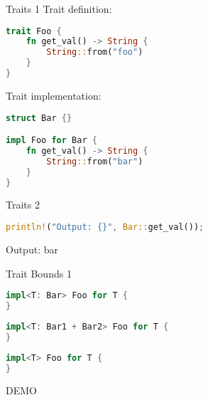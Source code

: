 
\begin{frame}[fragile,t]{Traits 1}
    Trait definition:
    \begin{lstlisting}[language=Rust,escapechar=@,label={lst:traits1}]
trait Foo {
    fn get_val() -> String {
        String::from("foo")
    }
}\end{lstlisting}

    \pause
    Trait implementation:
    \begin{lstlisting}[language=Rust,escapechar=@,label={lst:traits2}]
struct Bar {}

impl Foo for Bar {
    fn get_val() -> String {
        String::from("bar")
    }
}\end{lstlisting}

\end{frame}

\begin{frame}[fragile,t]{Traits 2}
    \begin{lstlisting}[language=Rust,escapechar=@,label={lst:traits3}]
println!("Output: {}", Bar::get_val());
\end{lstlisting}

    \pause
    \begin{codeoutput}
        Output: bar
    \end{codeoutput}
\end{frame}

\begin{frame}[fragile,t]{Trait Bounds 1}
    \begin{lstlisting}[language=Rust,escapechar=@,label={lst:traitbounds1}]
impl<T: Bar> Foo for T {
} \end{lstlisting}

    \pause
    \begin{lstlisting}[language=Rust,escapechar=@,label={lst:traitbounds2}]
impl<T: Bar1 + Bar2> Foo for T {
} \end{lstlisting}

    \pause
    \begin{lstlisting}[language=Rust,escapechar=@,label={lst:traitbounds3}]
impl<T> Foo for T {
} \end{lstlisting}

    \pause DEMO
\end{frame}
